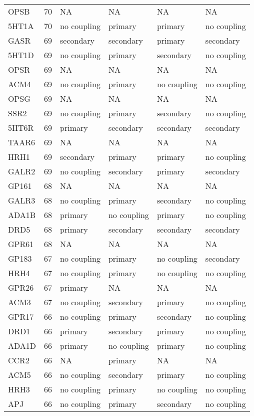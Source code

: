 \begin{longtable}{lrllll}
OPSB & 70 & NA & NA & NA & NA\\
5HT1A & 70 & no coupling & primary & primary & no coupling\\
GASR & 69 & secondary & secondary & primary & secondary\\
5HT1D & 69 & no coupling & primary & secondary & no coupling\\
\addlinespace
OPSR & 69 & NA & NA & NA & NA\\
ACM4 & 69 & no coupling & primary & no coupling & no coupling\\
OPSG & 69 & NA & NA & NA & NA\\
SSR2 & 69 & no coupling & primary & secondary & no coupling\\
5HT6R & 69 & primary & secondary & secondary & secondary\\
\addlinespace
TAAR6 & 69 & NA & NA & NA & NA\\
HRH1 & 69 & secondary & primary & primary & no coupling\\
GALR2 & 69 & no coupling & secondary & primary & secondary\\
GP161 & 68 & NA & NA & NA & NA\\
GALR3 & 68 & no coupling & primary & secondary & no coupling\\
\addlinespace
ADA1B & 68 & primary & no coupling & primary & no coupling\\
DRD5 & 68 & primary & secondary & secondary & secondary\\
GPR61 & 68 & NA & NA & NA & NA\\
GP183 & 67 & no coupling & primary & no coupling & secondary\\
HRH4 & 67 & no coupling & primary & no coupling & no coupling\\
\addlinespace
GPR26 & 67 & primary & NA & NA & NA\\
ACM3 & 67 & no coupling & secondary & primary & no coupling\\
GPR17 & 66 & no coupling & primary & secondary & no coupling\\
DRD1 & 66 & primary & secondary & primary & no coupling\\
ADA1D & 66 & primary & no coupling & primary & no coupling\\
\addlinespace
CCR2 & 66 & NA & primary & NA & NA\\
ACM5 & 66 & no coupling & secondary & primary & no coupling\\
HRH3 & 66 & no coupling & primary & no coupling & no coupling\\
APJ & 66 & no coupling & primary & secondary & no coupling\\

\end{longtable}
